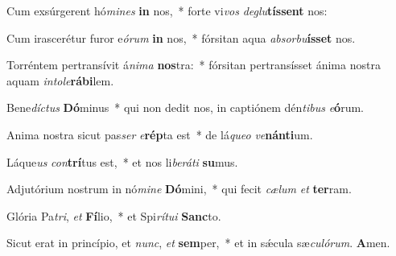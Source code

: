 Cum exsúrgerent hó\textit{mi}\textit{nes} \textbf{in} nos,~* forte vi\textit{vos} \textit{de}\textit{glu}\textbf{tís}\textbf{sent} nos:

Cum irascerétur furor e\textit{ó}\textit{rum} \textbf{in} nos,~* fórsitan aqua \textit{ab}\textit{sor}\textit{bu}\textbf{ís}\textbf{set} nos.

Torréntem pertransívit á\textit{ni}\textit{ma} \textbf{nos}tra:~* fórsitan pertransísset ánima nostra aquam \textit{in}\textit{to}\textit{le}\textbf{rá}\textbf{bi}lem.

Bene\textit{díc}\textit{tus} \textbf{Dó}minus~* qui non dedit nos, in captiónem dén\textit{ti}\textit{bus} \textit{e}\textbf{ó}rum.

Anima nostra sicut pas\textit{ser} \textit{e}\textbf{rép}ta est~* de lá\textit{que}\textit{o} \textit{ve}\textbf{nán}\textbf{ti}um.

Láque\textit{us} \textit{con}\textbf{trí}tus est,~* et nos li\textit{be}\textit{rá}\textit{ti} \textbf{su}mus.

Adjutórium nostrum in nó\textit{mi}\textit{ne} \textbf{Dó}mini,~* qui fecit \textit{cæ}\textit{lum} \textit{et} \textbf{ter}ram.

Glória Pa\textit{tri}, \textit{et} \textbf{Fí}lio,~* et Spi\textit{rí}\textit{tu}\textit{i} \textbf{Sanc}to.

Sicut erat in princípio, et \textit{nunc}, \textit{et} \textbf{sem}per,~* et in sǽcula sæ\textit{cu}\textit{ló}\textit{rum}. \textbf{A}men.

